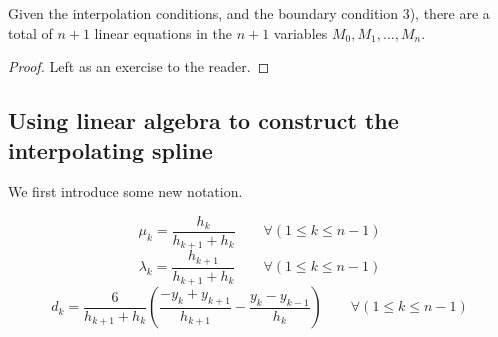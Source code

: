 \begin{thm}
  Given the interpolation conditions, and the boundary condition 3), there are a total of $n+1$ linear equations in the $n+1$ variables $M_0, M_1, \dots , M_n$.
\end{thm}
\begin{proof}
  Left as an exercise to the reader.
\end{proof}

\subsection{Using linear algebra to construct the interpolating spline}
We first introduce some new notation.
\begin{defn}
  \[
    \mu_k = \frac{h_k}{h_{k+1} + h_k} \qquad \forall(1 \leq k \leq n-1)
  \]
  \[
    \lambda_k = \frac{h_{k+1}}{h_{k+1} + h_k} \qquad \forall(1 \leq k \leq n-1)
  \]
  \[
    d_k = \frac{6}{h_{k+1} + h_k}
    \left(\frac{-y_k + y_{k+1}}{h_{k+1}} - \frac{y_k - y_{k-1}}{h_{k}} \right)
    \qquad \forall(1 \leq k \leq n-1)
  \]
\end{defn}

